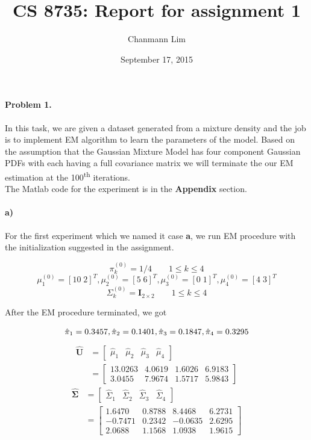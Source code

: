 \documentclass[a4paper]{article}
\begin{document}
\title{CS 8735: Report for assignment 1}
\author{Chanmann Lim}
\date{September 17, 2015}
\maketitle

\paragraph{Problem 1.} In this task, we are given a dataset generated from a mixture density and the job is to implement EM algorithm to learn the parameters of the model. Based on the assumption that the Gaussian Mixture Model has four component Gaussian PDFs with each having a full covariance matrix we will terminate the our EM estimation at the 100\textsuperscript{th} iterations. \\

\noindent The Matlab code for the experiment is in the \textbf{Appendix} section.

\paragraph{a) } For the first experiment which we named it case \textbf{a}, we run EM procedure with the initialization suggested in the assignment.

$$ \pi_k^{(0)} = 1/4 \qquad 1 \le k \le 4 $$
$$ \mu_1^{(0)} = [10\;2]^T, \mu_2^{(0)} = [5\;6]^T, \mu_3^{(0)} = [0\;1]^T, \mu_4^{(0)} = [4\;3]^T $$
$$ \Sigma_k^{(0)} = \mathbf{I}_{2\times2} \qquad 1 \le k \le 4 $$

After the EM procedure terminated, we got

\begin{equation}
	\hat{\pi}_1 = 0.3457, \hat{\pi}_2 = 0.1401, \hat{\pi}_3 = 0.1847, \hat{\pi}_4 = 0.3295\\
\end{equation}
\begin{align}
	\mathbf{\hat{U}} &= \begin{bmatrix}
							\hat{\mu}_1 & \hat{\mu}_2 & \hat{\mu}_3 & \hat{\mu}_4 
						\end{bmatrix} \\
					 & = \begin{bmatrix}
							13.0263  &  4.0619  &  1.6026  &  6.9183 \\
    						3.0455  &  7.9674  &  1.5717  &  5.9843
						 \end{bmatrix}
\end{align}
\begin{align}
	\mathbf{\hat{\Sigma}} &= \begin{bmatrix}
								\hat{\Sigma}_1 & \hat{\Sigma}_2 & \hat{\Sigma}_3 & \hat{\Sigma}_4 
							 \end{bmatrix} \\
						  & = \begin{bmatrix}
									1.6470  &  0.8788  &  8.4468  &  6.2731 \\
								   -0.7471  &  0.2342  & -0.0635  &  2.6295 \\
								    2.0688  &  1.1568  &  1.0938  &  1.9615
						 	  \end{bmatrix}
\end{align}
\end{document}
